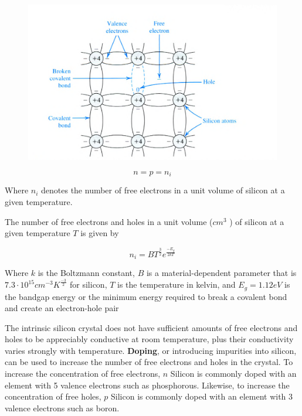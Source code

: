\documentclass[../notes.tex]{subfiles}
\begin{document}
\begin{figure}[H]
	\centering
	\includegraphics[width=0.8\linewidth]{img/image_2022-10-19-14-32-35.png}
\end{figure}

\begin{equation}
	n = p = n_i
\end{equation}

Where $ n_i $ denotes the number of free electrons in a unit volume of silicon at a given temperature.

\begin{theorem}
	The number of free electrons and holes in a unit volume ($ cm^3 $ ) of silicon at a given temperature $ T $ is given by

	\begin{equation}
	n_i = BT^{\frac{3}{2}} e^{\frac{-E_g}{2kT}}
	\end{equation}

Where $ k $ is the Boltzmann constant, $ B $ is a material-dependent parameter that is $ 7.3 \cdot  10^{15} cm^{-3}K^{\frac{-3}{2}}$ for silicon, $ T $ is the temperature in kelvin, and $ E_g = 1.12eV $ is the bandgap energy or the minimum energy required to break a covalent bond and create an electron-hole pair
\end{theorem}


The intrinsic silicon crystal does not have sufficient amounts of free electrons and holes to be appreciably conductive at room temperature, plus their conductivity varies strongly with temperature.
\textbf{Doping}, or introducing impurities into silicon, can be used to increase the number of free electrons and holes in the crystal.
To increase the concentration of free electrons, $ n $ Silicon is commonly doped with an element with 5 valence electrons such as phosphorous.
Likewise, to increase the concentration of free holes, $ p $ Silicon is commonly doped with an element with 3 valence electrons such as boron.
\end{document}
